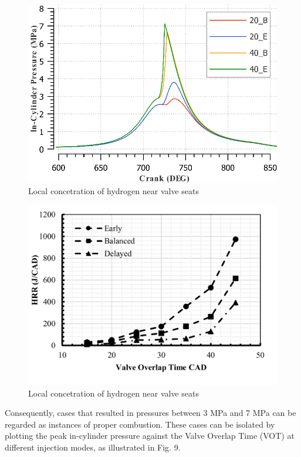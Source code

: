 \documentclass[conference]{IEEEtran}
\begin{document}
\begin{figure}[htbp]
    \centerline{\includegraphics{plots and graphs/7.png}}
    \caption{Local concetration of hydrogen near valve seats}
    \label{plt_7}
    \end{figure}

    \begin{figure}[htbp]
        \centerline{\includegraphics{plots and graphs/8.png}}
        \caption{Local concetration of hydrogen near valve seats}
        \label{plt_8}
        \end{figure}

Consequently, cases that resulted in pressures between 3 MPa and 7 MPa can be regarded as instances of proper combustion. These cases can be isolated by plotting the peak in-cylinder pressure against the Valve Overlap Time (VOT) at different injection modes, as illustrated in Fig. 9.
\end{document}
